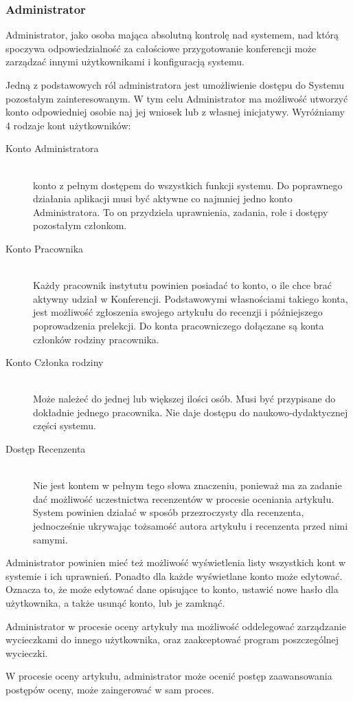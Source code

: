 \subsubsection{Administrator}
Administrator, jako osoba mająca absolutną kontrolę nad systemem, nad którą
spoczywa odpowiedzialność za całościowe przygotowanie konferencji może 
zarządzać innymi użytkownikami i konfiguracją systemu. \par
Jedną z podstawowych ról administratora jest umożliwienie dostępu do
Systemu pozostałym zainteresowanym. W tym celu Administrator ma możliwość 
utworzyć konto odpowiedniej osobie naj jej wniosek lub z własnej 
inicjatywy. Wyróżniamy 4 rodzaje kont użytkowników:
\begin{description}
    \item[Konto Administratora] \hfill \\
        konto z pełnym dostępem do wszystkich funkcji systemu.
        Do poprawnego działania aplikacji musi być aktywne co
        najmniej jedno konto Administratora. To on przydziela uprawnienia,
        zadania, role i dostępy pozostałym członkom.

    \item[Konto Pracownika] \hfill \\
        Każdy pracownik instytutu powinien posiadać to konto, 
        o ile chce brać aktywny udział w Konferencji. Podstawowymi 
        własnościami takiego konta, jest możliwość zgłoszenia swojego 
        artykułu do recenzji i późniejszego poprowadzenia prelekcji.
        Do konta pracowniczego dołączane są konta członków rodziny 
        pracownika.

    \item[Konto Członka rodziny] \hfill \\
        Może należeć do jednej lub większej ilości osób. Musi być 
        przypisane do dokładnie jednego pracownika. Nie daje dostępu do
        naukowo-dydaktycznej części systemu.

    \item[Dostęp Recenzenta] \hfill \\
        Nie jest kontem w pełnym tego słowa znaczeniu, ponieważ
        ma za zadanie dać możliwość uczestnictwa recenzentów w procesie
        oceniania artykułu. System powinien działać w sposób przezroczysty
        dla recenzenta, jednocześnie ukrywając tożsamość autora artykułu
        i recenzenta przed nimi samymi.

\end{description}
Administrator powinien mieć też możliwość wyświetlenia listy wszystkich 
kont w systemie i ich uprawnień. Ponadto dla każde wyświetlane konto
może edytować. Oznacza to, że może edytować dane opisujące to konto,
ustawić nowe hasło dla użytkownika, a także usunąć konto, lub je 
zamknąć. \par
Administrator w procesie oceny artykuły ma możliwość oddelegować 
zarządzanie wycieczkami do innego użytkownika, oraz zaakceptować
program poszczególnej wycieczki. \par
W procesie oceny artykułu, administrator może ocenić postęp zaawansowania
postępów oceny, może zaingerować w sam proces.\par
